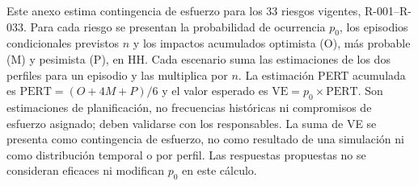 \documentclass[carta,firma,sinnotas]{lafrox}
\begin{document}
Este anexo estima contingencia de esfuerzo para los 33 riesgos vigentes, R-001--R-033. Para cada riesgo se presentan la probabilidad de ocurrencia $p_0$, los episodios condicionales previstos $n$ y los impactos acumulados optimista (O), más probable (M) y pesimista (P), en HH. Cada escenario suma las estimaciones de los dos perfiles para un episodio y las multiplica por $n$. La estimación PERT acumulada es $\mathrm{PERT}=(O+4M+P)/6$ y el valor esperado es $\mathrm{VE}=p_0\times\mathrm{PERT}$. Son estimaciones de planificación, no frecuencias históricas ni compromisos de esfuerzo asignado; deben validarse con los responsables. La suma de VE se presenta como contingencia de esfuerzo, no como resultado de una simulación ni como distribución temporal o por perfil. Las respuestas propuestas no se consideran eficaces ni modifican $p_0$ en este cálculo.
\end{document}
